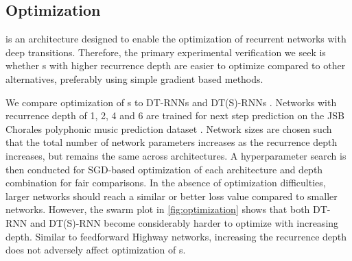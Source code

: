 \documentclass[letterpaper]{article}
\begin{document}
\subsection{Optimization}\label{sec:optimization}
\arch{} is an architecture designed to enable the optimization of recurrent networks with deep transitions.
Therefore, the primary experimental verification we seek is whether \arch{}s with higher recurrence depth are easier to optimize compared to other alternatives, preferably using simple gradient based methods.

We compare optimization of \arch{}s to DT-RNNs and DT(S)-RNNs \citep{pascanu}. 
Networks with recurrence depth of 1, 2, 4 and 6 are trained for next step prediction on the JSB Chorales polyphonic music prediction dataset \citep{polyphonic_music}.
Network sizes are chosen such that the total number of network parameters increases as the recurrence depth increases, but remains the same across architectures.
A hyperparameter search is then conducted for SGD-based optimization of each architecture and depth combination for fair comparisons.
In the absence of optimization difficulties, larger networks should  reach a similar or better loss value compared to smaller networks.
However, the swarm plot in \autoref{fig:optimization} shows that both DT-RNN and DT(S)-RNN become considerably harder to optimize with increasing depth.
Similar to feedforward Highway networks, increasing the recurrence depth does not adversely affect optimization of \arch{}s.
\end{document}
